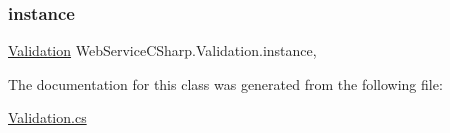 \subsubsection{\texorpdfstring{instance}{instance}}
{\footnotesize\ttfamily \hyperlink{class_web_service_c_sharp_1_1_validation}{Validation} Web\+Service\+C\+Sharp.\+Validation.\+instance\hspace{0.3cm}{\ttfamily [static]}, {\ttfamily [private]}}



The documentation for this class was generated from the following file\+:\begin{DoxyCompactItemize}
\item 
\hyperlink{_validation_8cs}{Validation.\+cs}\end{DoxyCompactItemize}
